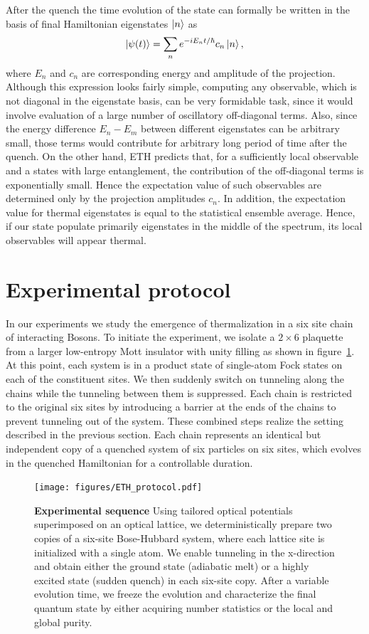 After the quench the time evolution of the state can formally be written in the basis of final Hamiltonian eigenstates $\left|n\right\rangle$ as
\begin{equation}
\left|\psi(t)\right\rangle=\sum_n e^{-iE_nt/\hbar}c_n\left|n\right\rangle,
\end{equation}
where $E_n$ and $c_n$ are corresponding energy and amplitude of the projection. Although this expression looks fairly simple, computing any observable, which is not diagonal in the eigenstate basis, can be very formidable task, since it would involve evaluation of a large number of oscillatory off-diagonal terms. Also, since the energy difference $E_n-E_m$ between different eigenstates can be arbitrary small, those terms would contribute for arbitrary long period of time after the quench. On the other hand, ETH predicts that, for a sufficiently local observable and a states with large entanglement, the contribution of the off-diagonal terms is exponentially small. Hence the expectation value of such observables are determined only by the projection amplitudes $c_n$. In addition, the expectation value for thermal eigenstates is equal to the statistical ensemble average. Hence, if our state populate primarily eigenstates in the middle of the spectrum, its local observables will appear thermal.  

\section{Experimental protocol}
In our experiments we study the emergence of thermalization in a six site chain of interacting Bosons. To initiate the experiment, we isolate a $2 \times 6$ plaquette from a larger low-entropy Mott insulator with unity filling as shown in figure~\ref{fig:ETH_protocol}. At this point, each system is in a product state of single-atom Fock states on each of the constituent sites. We then suddenly switch on tunneling along the chains while the tunneling between them is suppressed. Each chain is restricted to the original six sites by introducing a barrier at the ends of the chains to prevent tunneling out of the system. These combined steps realize the setting described in the previous section. Each chain represents an identical but independent copy of a quenched system of six particles on six sites, which evolves in the quenched Hamiltonian for a controllable duration.

\begin{figure}[h!]
	\centering
	\texttt{[image: figures/ETH\_protocol.pdf]}
	\caption{{\bf Experimental sequence} Using tailored optical potentials superimposed on an optical lattice, we deterministically prepare two copies of a six-site Bose-Hubbard system, where each lattice site is initialized with a single atom. We enable tunneling in the x-direction and obtain either the ground state (adiabatic melt) or a highly excited state (sudden quench) in each six-site copy. After a variable evolution time, we freeze the evolution and characterize the final quantum state by either acquiring number statistics or the local and global purity.}
	
	\label{fig:ETH_protocol}
\end{figure} 

